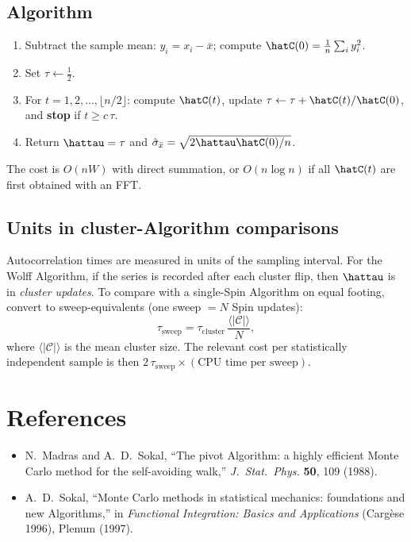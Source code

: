 \documentclass[a4paper, 10pt, onepage]{elegantbook}
\begin{document}
{\subsection{Algorithm}

\begin{enumerate}[nosep]
  \item Subtract the sample mean: $y_i=x_i-\bar x$; compute
        $\hatC(0)=\frac1n\sum_i y_i^2$.
  \item Set $\tau\leftarrow\tfrac12$.
  \item For $t=1,2,\dots,\lfloor n/2\rfloor$:
        compute $\hatC(t)$, update $\tau\leftarrow\tau+\hatC(t)/\hatC(0)$,
        and \textbf{stop} if $t\ge c\,\tau$.
  \item Return $\hattau=\tau$ and $\hat\sigma_{\bar x}=\sqrt{2\hattau\hatC(0)/n}$.
\end{enumerate}

\noindent The cost is $O(nW)$ with direct summation, or $O(n\log n)$ if all
$\hatC(t)$ are first obtained with an FFT.

\subsection{Units in cluster-Algorithm comparisons}

Autocorrelation times are measured in units of the sampling interval. For
the Wolff Algorithm, if the series is recorded after each cluster flip, then
$\hattau$ is in \emph{cluster updates}. To compare with a single-Spin
Algorithm on equal footing, convert to sweep-equivalents (one sweep $=N$
Spin updates):
\begin{equation}
  \tau_{\mathrm{sweep}}=\tau_{\mathrm{cluster}}\,\frac{\langle |\mathcal C|\rangle}{N},
\end{equation}
where $\langle|\mathcal C|\rangle$ is the mean cluster size. The relevant
cost per statistically independent sample is then
$2\,\tau_{\mathrm{sweep}}\times(\text{CPU time per sweep})$.

\section*{References}
\begin{itemize}[nosep,leftmargin=1.5em]
  \item N.~Madras and A.~D.~Sokal, ``The pivot Algorithm: a highly efficient
        Monte Carlo method for the self-avoiding walk,''
        \emph{J.\ Stat.\ Phys.} \textbf{50}, 109 (1988).
  \item A.~D.~Sokal, ``Monte Carlo methods in statistical mechanics:
        foundations and new Algorithms,'' in \emph{Functional Integration:
        Basics and Applications} (Cargèse 1996), Plenum (1997).
\end{itemize}

}
\end{document}

